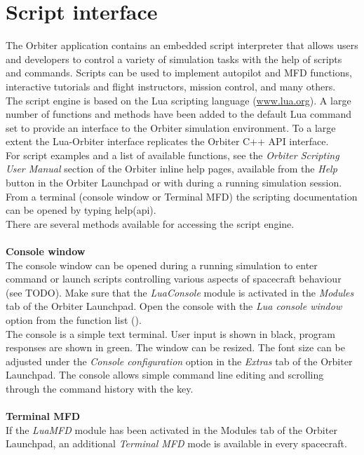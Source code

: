 \documentclass[Orbiter User Manual.tex]{subfiles}
\begin{document}
\section{Script interface}
The Orbiter application contains an embedded script interpreter that allows users and developers to control a variety of simulation tasks with the help of scripts and commands. Scripts can be used to implement autopilot and MFD functions, interactive tutorials and flight instructors, mission control, and many others.\\
The script engine is based on the Lua scripting language (\url{www.lua.org}). A large number of functions and methods have been added to the default Lua command set to provide an interface to the Orbiter simulation environment. To a large extent the Lua-Orbiter interface replicates the Orbiter C++ API interface.\\
For script examples and a list of available functions, see the \textit{Orbiter Scripting User Manual} section of the Orbiter inline help pages, available from the \textit{Help} button in the Orbiter Launchpad or with \Alt{} during a running simulation session. From a terminal (console window or Terminal MFD) the scripting documentation can be opened by typing help(api).\\
There are several methods available for accessing the script engine.\\
\\
\textbf{Console window}\\
The console window can be opened during a running simulation to enter command or launch scripts controlling various aspects of spacecraft behaviour (see TODO). Make sure that the \textit{LuaConsole} module is activated in the \textit{Modules} tab of the Orbiter Launchpad. Open the console with the \textit{Lua console window} option from the function list (\Ctrl{}).\\
The console is a simple text terminal. User input is shown in black, program responses are shown in green. The window can be resized. The font size can be adjusted under the \textit{Console configuration} option in the \textit{Extras} tab of the Orbiter Launchpad. The console allows simple command line editing and scrolling through the command history with the \UArrow key.\\
\\
\textbf{Terminal MFD}\\
If the \textit{LuaMFD} module has been activated in the Modules tab of the Orbiter Launchpad, an additional \textit{Terminal MFD} mode is available in every spacecraft.\\
\end{document}
